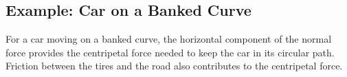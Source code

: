 \documentclass{article}
\begin{document}
\subsection*{Example: Car on a Banked Curve}
For a car moving on a banked curve, the horizontal component of the normal force provides the centripetal force needed to keep the car in its circular path. Friction between the tires and the road also contributes to the centripetal force.
\end{document}
